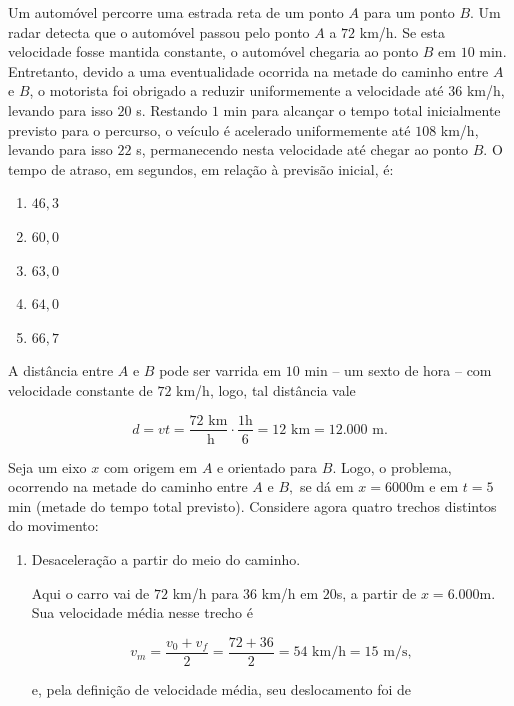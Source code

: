 \begin{exemplo}\label{exemplo_cinematica_muvvelocidademedia03}


Um automóvel percorre uma estrada reta de um ponto $A$ para um ponto $B$. Um radar detecta que o automóvel passou pelo ponto $A$ a $72$ km/h. Se esta velocidade fosse mantida constante, o automóvel chegaria ao ponto $B$ em $10$ min. Entretanto, devido a uma eventualidade ocorrida na metade do caminho entre $A$ e $B$, o motorista foi obrigado a reduzir uniformemente a velocidade até $36$ km/h, levando para isso $20$ s. Restando $1$ min para alcançar o tempo total inicialmente previsto para o percurso, o veículo é acelerado uniformemente até $108$ km/h, levando para isso $22$ s, permanecendo nesta velocidade até chegar ao ponto $B$. O tempo de atraso, em segundos, em relação à previsão inicial, é:
\begin{enumerate}
\item[(a)] $46{,}3$
\item[(b)] $60{,}0$
\item[(c)] $63{,}0$
\item[(d)] $64{,}0$
\item[(e)] $66{,}7$
\end{enumerate}

\resolucao


A distância entre $A$ e $B$ pode ser varrida em $10$ min -- um sexto de hora -- com velocidade constante de $72$ km/h, logo, tal distância vale

$$ d = vt =  \dfrac{72\text{ km}}{\text{ h}} \cdot \dfrac{1 \text{h}}{6} = 12 \text{ km} = 12.000 \text{ m}.$$

Seja um eixo $x$ com origem em $A$ e orientado para $B$. Logo, o problema, ocorrendo na metade do caminho entre $A$ e $B,$ se dá em $x=6000$m e em $t=5$ min (metade do tempo total previsto). Considere agora quatro trechos distintos do movimento:

\begin{enumerate}
    \item [(i)] Desaceleração a partir do meio do caminho.

    Aqui o carro vai de $72$ km/h para $36$ km/h em $20$s, a partir de $x=6.000$m. Sua velocidade média nesse trecho é

    $$ v_m = \dfrac{v_0+v_f}{2} = \dfrac{72+36}{2}=54 \text{ km/h} = 15 \text{ m/s},$$

    \noindent e, pela definição de velocidade média, seu deslocamento foi de


\end{enumerate}
\end{exemplo}
